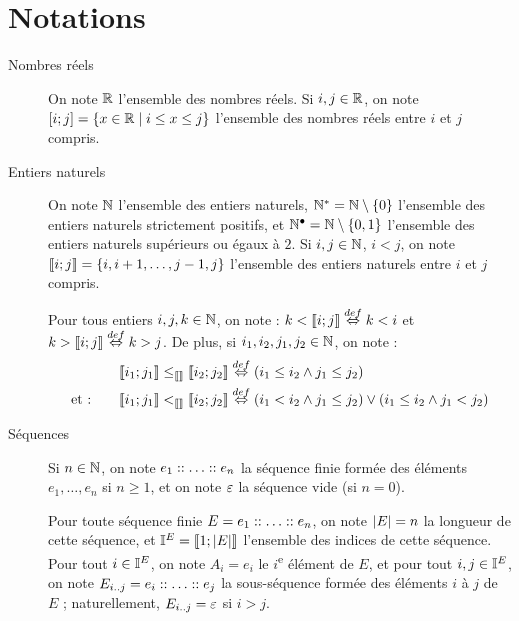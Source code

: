 \section{Notations}

\begin{description}
  \item[Nombres réels]
    On note $\mathbb{R}$ l'ensemble des nombres réels.
    Si $i, j \in \mathbb{R}$, on note $\mathopen{[}i\mathclose{};j\mathclose{]} = \{ x \in \mathbb{R} \mid i \leq x \leq j \}$
    l'ensemble des nombres réels entre $i$ et $j$ compris.
  
  \item[Entiers naturels]
    On note $\mathbb{N}$ l'ensemble des entiers naturels,
    $\mathbb{N}^* = \mathbb{N} \setminus \{ 0 \}$ l'ensemble des entiers naturels strictement positifs,
    et $\mathbb{N}^\bullet = \mathbb{N} \setminus \{ 0, 1 \}$ l'ensemble des entiers naturels
    supérieurs ou égaux à $2$.
    Si $i, j \in \mathbb{N}$, $i < j$, on note $\mathopen{\llbracket}i\mathclose{};j\mathclose{\rrbracket} = \{ i, i+1, \ldots, j-1, j \}$
    l'ensemble des entiers naturels entre $i$ et $j$ compris.
    
    Pour tous entiers $i, j, k \in \mathbb{N}$, on note :
    $k < \mathopen{\llbracket}i\mathclose{};j\mathclose{\rrbracket} \stackrel{def}\Leftrightarrow k < i$ et $k > \mathopen{\llbracket}i\mathclose{};j\mathclose{\rrbracket} \stackrel{def}\Leftrightarrow k > j$.
    De plus, si $i_1, i_2, j_1, j_2 \in \mathbb{N}$, on note :
    \begin{align*}
      \mathopen{\llbracket}i_1\mathclose{};j_1\mathclose{\rrbracket} \leq_{\llbracket\rrbracket} \mathopen{\llbracket}i_2\mathclose{};j_2\mathclose{\rrbracket} &\stackrel{def}\Leftrightarrow (i_1 \leq i_2 \wedge j_1 \leq j_2) \\
      \text{et :} \qquad \mathopen{\llbracket}i_1\mathclose{};j_1\mathclose{\rrbracket} <_{\llbracket\rrbracket} \mathopen{\llbracket}i_2\mathclose{};j_2\mathclose{\rrbracket} &\stackrel{def}\Leftrightarrow (i_1<i_2 \wedge j_1\leq j_2) \vee (i_1\leq i_2\wedge j_1 < j_2)
    \end{align*}

  
  \item[Séquences]
    Si $n \in \mathbb{N}$, on note $e_1 :: \ldots :: e_n$ la séquence finie formée
    des éléments $e_1, \ldots, e_n$ si $n \geq 1$,
    et on note $\varepsilon$ la séquence vide (si $n = 0$).
    
    Pour toute séquence finie $E = e_1 :: \ldots :: e_n$,
    on note $|E| = n$ la longueur de cette séquence,
    et $\mathbb{I}^{E} = \mathopen{\llbracket}1\mathclose{};|E|\mathclose{\rrbracket}$ l'ensemble des indices de cette séquence.
    Pour tout $i \in \mathbb{I}^{E}$, on note $A_i = e_i$ le $i$\textsuperscript{e} élément de $E$,
    et pour tout $i,j \in \mathbb{I}^{E}$, on note $E_{i..j} = e_i :: \ldots :: e_j$
    la sous-séquence formée des éléments $i$ à $j$ de $E$ ;
    naturellement, $E_{i..j} = \varepsilon$ si $i > j$.
    

\end{description}

